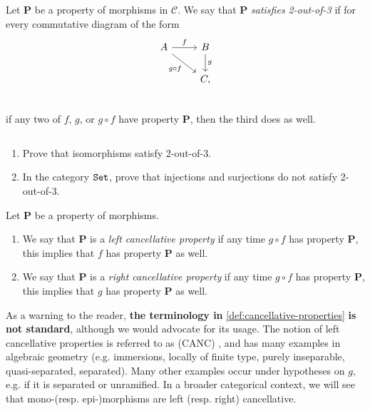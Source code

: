 \begin{definition}\label{def:2-out-of-3} Let \textbf{P} be a property of morphisms in $\mathscr{C}$. We say that \textbf{P} \textit{satisfies 2-out-of-3} if for every commutative diagram of the form
\[ \begin{tikzcd}
    A\rar["f" above]\ar[dr,"g\circ f" below left] & B\dar["g" right]\\
     & C,\\
\end{tikzcd} \]
if any two of $f$, $g$, or $g\circ f$ have property \textbf{P}, then the third does as well.
\end{definition}


\begin{exercise} $\ $
\begin{enumerate}
    \item Prove that isomorphisms satisfy 2-out-of-3.
    \item In the category $\texttt{Set}$, prove that injections and surjections do not satisfy 2-out-of-3.
\end{enumerate}
\end{exercise}

\begin{definition}\label{def:cancellative-properties} Let \textbf{P} be a property of morphisms.
\begin{enumerate}
    \item We say that \textbf{P} is a \textit{left cancellative property} if any time $g\circ f$ has property \textbf{P}, this implies that $f$ has property \textbf{P} as well.
    \item We say that \textbf{P} is a \textit{right cancellative property} if any time $g\circ f$ has property \textbf{P}, this implies that $g$ has property \textbf{P} as well.
\end{enumerate}
\end{definition}
As a warning to the reader, \textbf{the terminology in} \autoref{def:cancellative-properties} \textbf{is not standard}, although we would advocate for its usage. The notion of left cancellative properties is referred to as (CANC) \cite[Appendix~C]{GortzWedhorn}, and has many examples in algebraic geometry (e.g. immersions, locally of finite type, purely inseparable, quasi-separated, separated). Many other examples occur under hypotheses on $g$, e.g. if it is separated or unramified. In a broader categorical context, we will see that mono-(resp. epi-)morphisms are left (resp. right) cancellative. 


